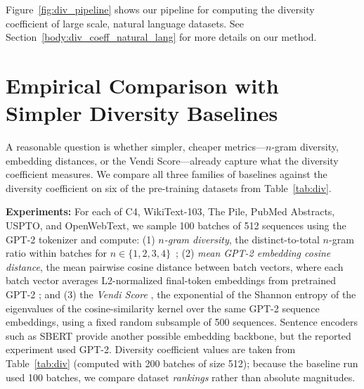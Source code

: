 Figure~\ref{fig:div_pipeline} shows our pipeline for computing the diversity coefficient of large scale, natural language datasets. See Section~\ref{body:div_coeff_natural_lang} for more details on our method.

\section{Empirical Comparison with Simpler Diversity Baselines}
\label{appendix:baseline_metrics}
A reasonable question is whether simpler, cheaper metrics---$n$-gram diversity, embedding distances, or the Vendi Score---already capture what the diversity coefficient measures.
We compare all three families of baselines against the diversity coefficient on six of the pre-training datasets from Table~\ref{tab:div}.

\textbf{Experiments:}
For each of C4, WikiText-103, The Pile, PubMed Abstracts, USPTO, and OpenWebText, we sample 100 batches of 512 sequences using the GPT-2 tokenizer and compute:
(1) \emph{$n$-gram diversity}, the distinct-to-total $n$-gram ratio within batches for $n \in \{1,2,3,4\}$~\citep{li2016diversity};
(2) \emph{mean GPT-2 embedding cosine distance}, the mean pairwise cosine distance between batch vectors, where each batch vector averages L2-normalized final-token embeddings from pretrained GPT-2 \citep{gpt2}; and
(3) the \emph{Vendi Score} \citep{friedman2022vendi}, the exponential of the Shannon entropy of the eigenvalues of the cosine-similarity kernel over the same GPT-2 sequence embeddings, using a fixed random subsample of 500 sequences.
Sentence encoders such as SBERT \citep{reimers2019sentence} provide another possible embedding backbone, but the reported experiment used GPT-2.
Diversity coefficient values are taken from Table~\ref{tab:div} (computed with 200 batches of size 512); because the baseline run used 100 batches, we compare dataset \emph{rankings} rather than absolute magnitudes.

